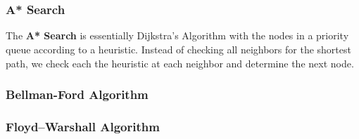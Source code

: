 \documentclass[a4paper]{article}
\theoremstyle{definition}
\begin{document}
\begin{enumerate}
\begin{figure}[H]
 ~
 ~
 
 ~
\end{figure}

\end{enumerate}
\subsubsection{A* Search}
The \textbf{A* Search} is essentially Dijkstra's Algorithm with the nodes in a priority queue according to a heuristic. Instead of checking all neighbors for the shortest path, we check each the heuristic at each neighbor and determine the next node.
\subsubsection{Bellman-Ford Algorithm}
\subsubsection{Floyd–Warshall Algorithm}
\end{document}
